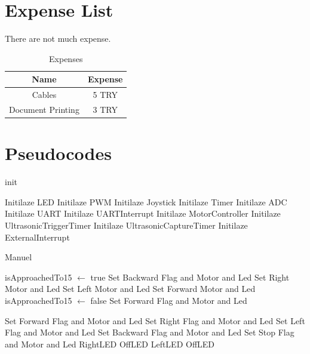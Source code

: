 \documentclass[12pt]{article}
\begin{document}
\newpage



\newpage



\section{Expense List} %
There are not much expense.

\begin{table}[H]
    \centering
    \begin{tabular}{|c|c|}
        \hline
        Name & Expense \\\hline
        Cables & 5 TRY \\\hline
        Document Printing & 3 TRY \\\hline
    \end{tabular}
    \caption{Expenses}
\end{table}
\newpage



\section{Pseudocodes}

\begin{algorithm}
\caption{init}
\begin{algorithmic} 
\STATE	Initilaze LED
\STATE	Initilaze PWM
\STATE	Initilaze Joystick
\STATE	Initilaze Timer
\STATE	Initilaze ADC
\STATE	Initilaze UART
\STATE	Initilaze UARTInterrupt
\STATE	Initilaze MotorController
\STATE	Initilaze UltrasonicTriggerTimer
\STATE	Initilaze UltrasonicCaptureTimer
\STATE	Initilaze ExternalInterrupt
\end{algorithmic}
\end{algorithm}

\begin{algorithm}
\caption{Manuel}
\begin{algorithmic} 
\STATE isApproachedTo15 $\leftarrow$ true
\STATE Set Backward Flag and Motor and Led	
\ENDIF
{}
\STATE Set Right Motor and Led
\STATE Set Left Motor and Led
\ELSE
\STATE Set Forward Motor and Led
\ENDIF
\ENDIF
{}
\STATE isApproachedTo15 $\leftarrow$ false
\STATE Set Forward Flag and Motor and Led
\ENDIF

\STATE Set Forward Flag and Motor and Led
\STATE Set Right Flag and Motor and Led
\STATE Set Left Flag and Motor and Led
\STATE Set Backward Flag and Motor and Led
\STATE Set Stop Flag and Motor and Led
\ENDIF
{}
\STATE RightLED
\ELSE
\STATE OffLED
\ENDIF
\ENDIF
{}
\STATE LeftLED
\ELSE
\STATE OffLED
\ENDIF
\ENDIF
\end{algorithmic}
\end{algorithm}
\end{document}
